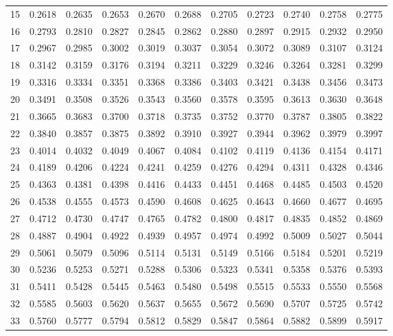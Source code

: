 {\begin{tabular}{|c|cccccccccc|}
\hline
15 & 0.2618 & 0.2635 & 0.2653 & 0.2670 & 0.2688 & 0.2705 & 0.2723 & 0.2740 & 0.2758 & 0.2775 \\
16 & 0.2793 & 0.2810 & 0.2827 & 0.2845 & 0.2862 & 0.2880 & 0.2897 & 0.2915 & 0.2932 & 0.2950 \\
17 & 0.2967 & 0.2985 & 0.3002 & 0.3019 & 0.3037 & 0.3054 & 0.3072 & 0.3089 & 0.3107 & 0.3124 \\
18 & 0.3142 & 0.3159 & 0.3176 & 0.3194 & 0.3211 & 0.3229 & 0.3246 & 0.3264 & 0.3281 & 0.3299 \\
19 & 0.3316 & 0.3334 & 0.3351 & 0.3368 & 0.3386 & 0.3403 & 0.3421 & 0.3438 & 0.3456 & 0.3473 \\
\hline
20 & 0.3491 & 0.3508 & 0.3526 & 0.3543 & 0.3560 & 0.3578 & 0.3595 & 0.3613 & 0.3630 & 0.3648 \\
21 & 0.3665 & 0.3683 & 0.3700 & 0.3718 & 0.3735 & 0.3752 & 0.3770 & 0.3787 & 0.3805 & 0.3822 \\
22 & 0.3840 & 0.3857 & 0.3875 & 0.3892 & 0.3910 & 0.3927 & 0.3944 & 0.3962 & 0.3979 & 0.3997 \\
23 & 0.4014 & 0.4032 & 0.4049 & 0.4067 & 0.4084 & 0.4102 & 0.4119 & 0.4136 & 0.4154 & 0.4171 \\
24 & 0.4189 & 0.4206 & 0.4224 & 0.4241 & 0.4259 & 0.4276 & 0.4294 & 0.4311 & 0.4328 & 0.4346 \\
\hline
25 & 0.4363 & 0.4381 & 0.4398 & 0.4416 & 0.4433 & 0.4451 & 0.4468 & 0.4485 & 0.4503 & 0.4520 \\
26 & 0.4538 & 0.4555 & 0.4573 & 0.4590 & 0.4608 & 0.4625 & 0.4643 & 0.4660 & 0.4677 & 0.4695 \\
27 & 0.4712 & 0.4730 & 0.4747 & 0.4765 & 0.4782 & 0.4800 & 0.4817 & 0.4835 & 0.4852 & 0.4869 \\
28 & 0.4887 & 0.4904 & 0.4922 & 0.4939 & 0.4957 & 0.4974 & 0.4992 & 0.5009 & 0.5027 & 0.5044 \\
29 & 0.5061 & 0.5079 & 0.5096 & 0.5114 & 0.5131 & 0.5149 & 0.5166 & 0.5184 & 0.5201 & 0.5219 \\
\hline
30 & 0.5236 & 0.5253 & 0.5271 & 0.5288 & 0.5306 & 0.5323 & 0.5341 & 0.5358 & 0.5376 & 0.5393 \\
31 & 0.5411 & 0.5428 & 0.5445 & 0.5463 & 0.5480 & 0.5498 & 0.5515 & 0.5533 & 0.5550 & 0.5568 \\
32 & 0.5585 & 0.5603 & 0.5620 & 0.5637 & 0.5655 & 0.5672 & 0.5690 & 0.5707 & 0.5725 & 0.5742 \\
33 & 0.5760 & 0.5777 & 0.5794 & 0.5812 & 0.5829 & 0.5847 & 0.5864 & 0.5882 & 0.5899 & 0.5917 \\

\end{tabular}}
